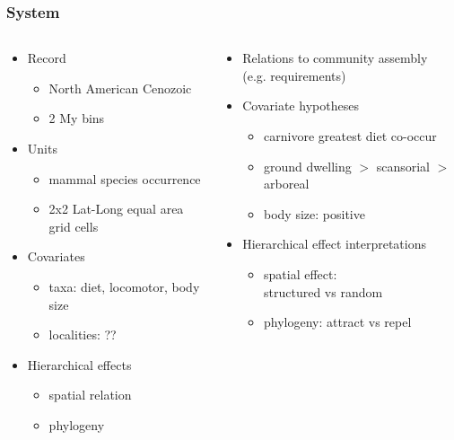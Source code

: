 \documentclass{beamer}
\begin{document}
\begin{frame}
  \frametitle{System}
  \begin{columns}
    \begin{column}{0.5\textwidth}
      \begin{itemize}
        \item Record
          \begin{itemize}
            \item North American Cenozoic
            \item 2 My bins
          \end{itemize}
        \item Units
          \begin{itemize}
            \item mammal species occurrence
            \item 2x2 Lat-Long equal area grid cells
          \end{itemize}
        \item Covariates
          \begin{itemize}
            \item taxa: diet, locomotor, body size
            \item localities: ??
          \end{itemize}
        \item Hierarchical effects
          \begin{itemize}
            \item spatial relation
            \item phylogeny
          \end{itemize}
      \end{itemize}
    \end{column}
    \begin{column}{0.5\textwidth}
      \begin{itemize}
        \item Relations to community assembly \\(e.g. requirements)
        \item Covariate hypotheses
          \begin{itemize}
            \item carnivore greatest diet co-occur
            \item ground dwelling \(>\) scansorial \(>\) arboreal
            \item body size: positive
          \end{itemize}
        \item Hierarchical effect interpretations
          \begin{itemize}
            \item spatial effect: \\structured vs random
            \item phylogeny: attract vs repel
          \end{itemize}
      \end{itemize}
    \end{column}
  \end{columns}
\end{frame}
\end{document}
